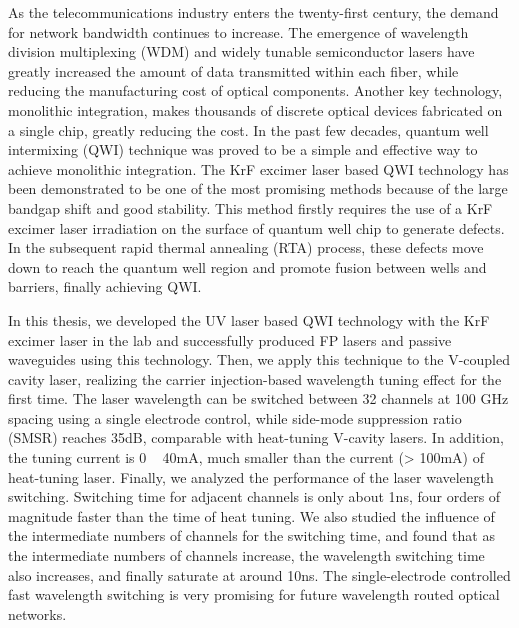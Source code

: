 \documentclass[oneside]{ZJUthesis}
\begin{document}
\begin{englishabstract}
As the telecommunications industry enters the twenty-first century, the demand for network bandwidth continues to increase. The emergence of wavelength division multiplexing (WDM) and widely tunable semiconductor lasers have greatly increased the amount of data transmitted within each fiber, while reducing the manufacturing cost of optical components. Another key technology, monolithic integration, makes thousands of discrete optical devices fabricated on a single chip, greatly reducing the cost. In the past few decades, quantum well intermixing (QWI) technique was proved to be a simple and effective way to achieve monolithic integration. The KrF excimer laser based QWI technology has been demonstrated to be one of the most promising methods because of the large bandgap shift and good stability. This method firstly requires the use of a KrF excimer laser irradiation on the surface of quantum well chip to generate defects. In the subsequent rapid thermal annealing (RTA) process, these defects move down to reach the quantum well region and promote fusion between wells and barriers, finally achieving QWI.

In this thesis, we developed the UV laser based QWI technology with the KrF excimer laser in the lab and successfully produced FP lasers and passive waveguides using this technology. Then, we apply this technique to the V-coupled cavity laser, realizing the carrier injection-based wavelength tuning effect for the first time. The laser wavelength can be switched between 32 channels at 100 GHz spacing using a single electrode control, while side-mode suppression ratio (SMSR) reaches 35dB, comparable with heat-tuning V-cavity lasers. In addition, the tuning current is 0 ~ 40mA, much smaller than the current (> 100mA) of heat-tuning laser. Finally, we analyzed the performance of the laser wavelength switching. Switching time for adjacent channels is only about 1ns, four orders of magnitude faster than the time of heat tuning. We also studied the influence of the intermediate numbers of channels for the switching time, and found that as the intermediate numbers of channels increase, the wavelength switching time also increases, and finally saturate at around 10ns. The single-electrode controlled fast wavelength switching is very promising for future wavelength routed optical networks.

\end{englishabstract}
\end{document}
